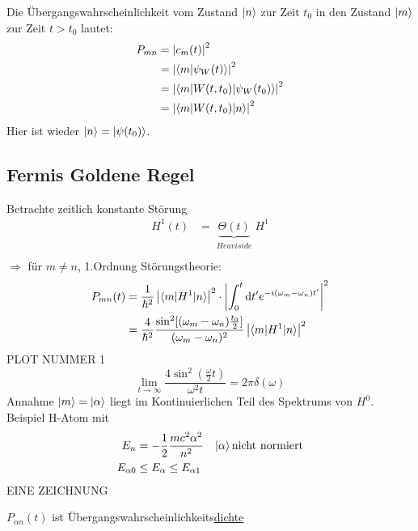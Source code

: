 	Die Übergangswahrscheinlichkeit vom Zustand $\ket{n}$ zur Zeit $t_0$ in den Zustand $\ket{m}$ zur Zeit $t>t_0$ lautet:
		\begin{align*}
			P_{mn} &= \left| c_m(t) \right|^2 \\
			&= \left| \braket{m | \psi_W(t)} \right|^2 \\
			&= \left| \braket{m | W(t,t_0) | \psi_W(t_0)} \right|^2 \\
			&= \left| \braket{m | W(t,t_0) | n}\right|^2
		\end{align*}
	Hier ist wieder $\ket{n} = \ket{\psi(t_0)}$.
\subsection{Fermis Goldene Regel}
	Betrachte zeitlich konstante Störung
		\begin{align*}
			H^1(t) &= \underbrace{\Theta (t)}_{\substack{Heaviside}} H^1 \\
		\end{align*}
	$\Rightarrow$ für $m \neq n$, 1.Ordnung Störungstheorie:
		\begin{align*}
			P_{mn}(t) 
			&= \frac{1}{\hbar^2} \left| \braket{m | H^1 | n}\right|^2 
			\cdot \left| \int_{0}^{t} \mathrm{d} t' e^{-i(\omega_m-\omega_n) t'} \right|^2 \\
			&= \frac{4}{\hbar^2} \frac{\sin^2[(\omega_m-\omega_n)
			\frac{t_0}{2}]}{(\omega_m-\omega_n)^2} 
			\left| \braket{m | H^1 | n}\right|^2
		\end{align*}
	PLOT NUMMER 1
		\begin{equation*}
			\lim\limits_{t \rightarrow \infty} \frac{4 \sin^2(\frac{\omega}{2} t)}{\omega^2 t} = 2 \pi \delta (\omega)
		\end{equation*}
	Annahme $\ket{m} = \ket{\alpha}$ liegt im Kontinuierlichen Teil des Spektrums von $H^0$. Beispiel H-Atom mit
		\begin{align*}
			E_n &= - \frac{1}{2} \frac{m c^2 \alpha^2}{n^2} &
			\ket{\alpha} \text{nicht normiert} \\
			E_{\alpha 0} &\leq E_\alpha \leq E_{\alpha 1}
		\end{align*}
	EINE ZEICHNUNG

	$P_{\alpha n}(t)$ ist Übergangswahrscheinlichkeits\underline{dichte}
	
